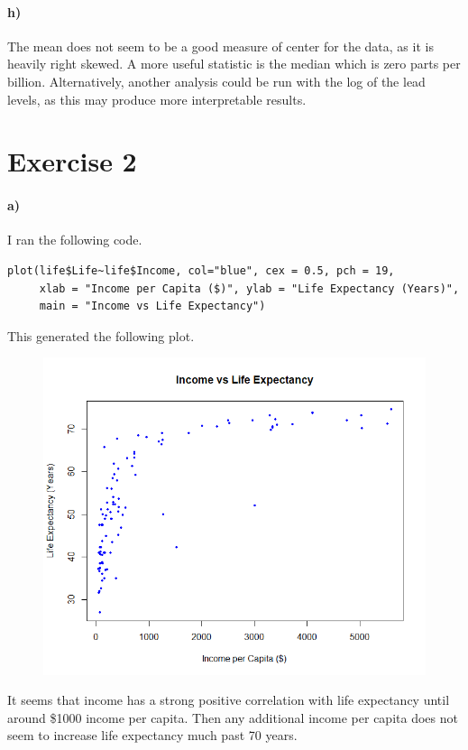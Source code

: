 \documentclass[12pt]{article}
\begin{document}
\paragraph{h)}

The mean does not seem to be a good measure of center for the data, as it is heavily right skewed.
A more useful statistic is the median which is zero parts per billion. Alternatively, another
analysis could be run with the log of the lead levels, as this may produce more interpretable results.

\section*{Exercise 2}

\paragraph{a)}

I ran the following code.
\scriptsize
\begin{verbatim}
plot(life$Life~life$Income, col="blue", cex = 0.5, pch = 19,
     xlab = "Income per Capita ($)", ylab = "Life Expectancy (Years)",
     main = "Income vs Life Expectancy")
\end{verbatim}
\normalsize
This generated the following plot.
\begin{figure}[H]
    \begin{center}
        \includegraphics[width=4.5in]{exercise2a.png}
    \end{center}
\end{figure}
It seems that income has a strong positive correlation with life expectancy until around \$1000
income per capita. Then any additional income per capita does not seem to increase life expectancy
much past 70 years.
\end{document}
